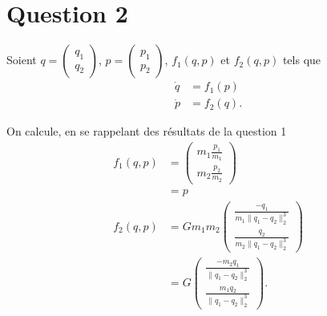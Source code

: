 \section*{Question 2}
Soient $q =
\begin{pmatrix}
  q_1\\
  q_2
\end{pmatrix}$,
$p =
\begin{pmatrix}
  p_1\\
  p_2
\end{pmatrix}$,
$f_1(q,p)$ et $f_2(q,p)$ tels que
\begin{align*}
  \dot{q} & = f_1(p)\\
  \dot{p} & = f_2(q).
\end{align*}

On calcule, en se rappelant des résultats de la question 1
\begin{align*}
  f_1(q,p) & =
  \begin{pmatrix}
    m_1\frac{p_1}{m_1}\\
    m_2\frac{p_2}{m_2}
  \end{pmatrix}\\
  & = p\\
%
  f_2(q,p) & = Gm_1m_2
  \begin{pmatrix}
    \frac{-q_1}{m_1\|q_1-q_2\|_2^3}\\
    \frac{q_2}{m_2\|q_1-q_2\|_2^3}
  \end{pmatrix}\\
  & = G
  \begin{pmatrix}
    \frac{-m_2q_1}{\|q_1-q_2\|_2^3}\\
    \frac{m_1q_2}{\|q_1-q_2\|_2^3}
  \end{pmatrix}.
\end{align*}

